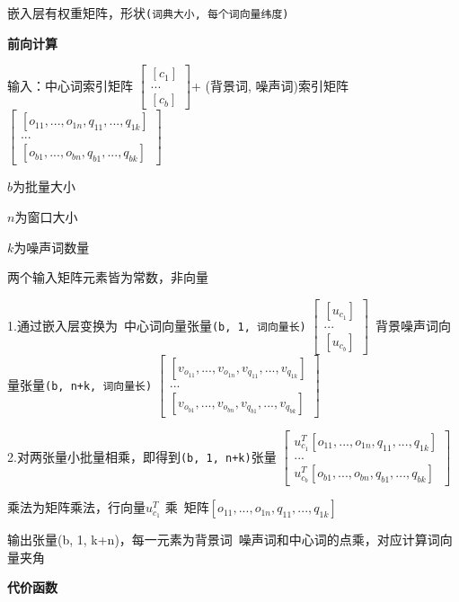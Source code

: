 \documentclass[UTF8]{ctexart}
\begin{document}
  \quad 嵌入层有权重矩阵，形状\texttt{(词典大小, 每个词向量纬度)}

  \textbf{前向计算}

  \quad 输入：中心词索引矩阵
    $\begin{bmatrix}
      [c_1] \\
      ... \\
      [c_b]
      \end{bmatrix}
    $+ (背景词, 噪声词)索引矩阵
    $\begin{bmatrix}
      [o_{11}, ..., o_{1n}, q_{11}, ..., q_{1k}] \\
      ... \\
      [o_{b1}, ..., o_{bn}, q_{b1}, ..., q_{bk}]
      \end{bmatrix}
    $

  \quad \quad $b$为批量大小

  \quad \quad $n$为窗口大小

  \quad \quad $k$为噪声词数量

  \quad \quad 两个输入矩阵元素皆为常数，非向量

  \quad 1.通过嵌入层变换为\ 中心词向量张量\texttt{(b, 1, 词向量长)}
  $\begin{bmatrix}
    [u_{c_1}] \\
    ... \\
    [u_{c_b}]
    \end{bmatrix}
  $\ 背景噪声词向量张量\texttt{(b, n+k, 词向量长)}
  $\begin{bmatrix}
    [v_{o_{11}}, ..., v_{o_{1n}}, v_{q_{11}}, ..., v_{q_{1k}}] \\
    ... \\
    [v_{o_{b1}}, ..., v_{o_{bn}}, v_{q_{b1}}, ..., v_{q_{bk}}]
    \end{bmatrix}
  $

  \quad 2.对两张量小批量相乘，即得到\texttt{(b, 1, n+k)}张量
  $\begin{bmatrix}
    u_{c_1}^T [o_{11}, ..., o_{1n}, q_{11}, ..., q_{1k}] \\
    ... \\
    u_{c_b}^T [o_{b1}, ..., o_{bn}, q_{b1}, ..., q_{bk}]
    \end{bmatrix}
  $

  \quad 乘法为矩阵乘法，行向量$u_{c_1}^T$ 乘\ 矩阵$[o_{11}, ..., o_{1n}, q_{11}, ..., q_{1k}]$
  
  \quad 输出张量(b, 1, k+n)，每一元素为背景词\ 噪声词和中心词的点乘，对应计算词向量夹角
  
  \textbf{代价函数}
\end{document}
